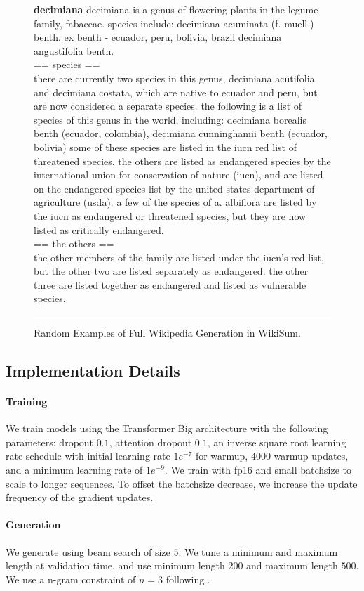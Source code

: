 \documentclass[11pt,a4paper]{article}
\begin{document}
\begin{figure*}[t]
    \noindent \textbf{decimiana} decimiana is a genus of flowering plants in the legume family, fabaceae. species include: decimiana acuminata (f. muell.) benth. ex benth - ecuador, peru, bolivia, brazil decimiana angustifolia benth. \\
    == species == \\ there are currently two species in this genus, decimiana acutifolia and decimiana costata, which are native to ecuador and peru, but are now considered a separate species. the following is a list of species of this genus in the world, including:  decimiana borealis benth (ecuador, colombia), decimiana cunninghamii benth (ecuador, bolivia) some of these species are listed in the iucn red list of threatened species. the others are listed as endangered species by the international union for conservation of nature (iucn), and are listed on the endangered species list by the united states department of agriculture (usda). a few of the species of a. albiflora are listed by the iucn as endangered or threatened species, but they are now listed as critically endangered. \\ 
    == the others == \\ the other members of the family are listed under the iucn's red list, but the other two are listed separately as endangered. the other three are listed together as endangered and listed as vulnerable species. \\
  \rule{\linewidth}{1pt}
  \caption{Random Examples of Full Wikipedia Generation in WikiSum.}
  \label{fig:examples_wikipedia_generation}
\end{figure*} 

\subsection{Implementation Details} 

\paragraph{Training} We train models using the Transformer Big architecture with the following parameters: dropout $0.1$, attention dropout $0.1$, an inverse square root learning rate schedule with initial learning rate $1e^{-7}$ for warmup, $4000$ warmup updates, and a minimum learning rate of $1e^{-9}$. We train with fp16 and small batchsize to scale to longer sequences. To offset the batchsize decrease, we increase the update frequency of the gradient updates. 

\paragraph{Generation} We generate using beam search of size $5$. We tune a minimum and maximum length at validation time, and use minimum length $200$ and maximum length $500$. We use a n-gram constraint of $n=3$ following \cite{fan2019explain}.  
\end{document}
